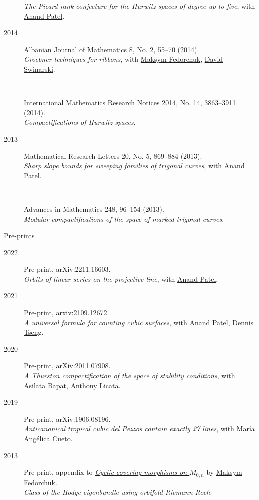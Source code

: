 \documentclass[11pt]{article}
\begin{document}
\begin{description}
\emph{The Picard rank conjecture for the Hurwitz spaces of degree up to five}, with \href{https://www2.bc.edu/anand-p-patel/}{Anand Patel}.
\item[{2014}] Albanian Journal of Mathematics 8, No. 2, 55--70 (2014).\\
\emph{Groebner techniques for ribbons}, with \href{https://www2.bc.edu/maksym-fedorchuk/}{Maksym Fedorchuk}, \href{http://faculty.fordham.edu/dswinarski/}{David Swinarski}.
\item[{---}] International Mathematics Research Notices 2014, No. 14, 3863--3911 (2014).\\
\emph{Compactifications of Hurwitz spaces}.
\item[{2013}] Mathematical Research Letters 20, No. 5, 869--884 (2013).\\
\emph{Sharp slope bounds for sweeping families of trigonal curves}, with \href{https://sites.google.com/view/anand-patel}{Anand Patel}.
\item[{---}] Advances in Mathematics 248, 96--154 (2013).\\
\emph{Modular compactifications of the space of marked trigonal curves}.
\end{description}

\begin{description}
\item[{Pre-prints}] 
\end{description}
\label{org93fd15f}
\begin{description}
\item[{2022}] Pre-print, arXiv:2211.16603.\\
\emph{Orbits of linear series on the projective line}, with \href{https://sites.google.com/view/anand-patel}{Anand Patel}.
\item[{2021}] Pre-print, arxiv:2109.12672.\\
\emph{A universal formula for counting cubic surfaces}, with \href{https://sites.google.com/view/anand-patel}{Anand Patel}, \href{https://sites.google.com/view/dennis-tseng}{Dennis Tseng}.
\item[{2020}] Pre-print, arXiv:2011.07908.\\
\emph{A Thurston compactification of the space of stability conditions}, with \href{https://asilata.github.io/}{Asilata Bapat}, \href{https://maths-people.anu.edu.au/\~licatat/}{Anthony Licata}.
\item[{2019}] Pre-print, arXiv:1906.08196.\\
\emph{Anticanonical tropical cubic del Pezzos contain exactly 27 lines}, with \href{https://people.math.osu.edu/cueto.5/}{María Angélica Cueto}.
\item[{2013}] Pre-print, appendix to \href{https://drive.google.com/file/d/1wq-Fh3DiqODc51t-J0phIexVF7B4lxsY/view}{\emph{Cyclic covering morphisms on \(\overline M_{0,n}\)}} by \href{https://www2.bc.edu/maksym-fedorchuk/}{Maksym Fedorchuk}.\\
\emph{Class of the Hodge eigenbundle using orbifold Riemann-Roch}.
\end{description}
\end{document}
